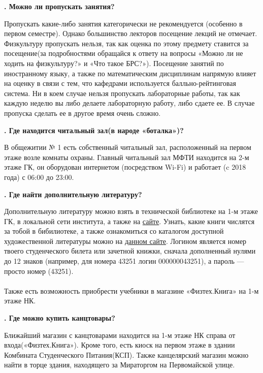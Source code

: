 \documentclass[14pt]{extarticle}
\newcounter{question}
\newcommand\Que[1]{%
    \begin{minipage}{\textwidth}
    \leavevmode\par
    \stepcounter{question}
    \noindent
    {\large\textbf{\thequestion. #1}}\par}
\newcommand\Ans[2][]{%
    \leavevmode\par\noindent
    {\leftskip37pt
    \textbf{#1}#2\par}
    \end{minipage}}
\begin{document}
\Que{Можно ли пропускать занятия?}
\Ans{Пропускать какие-либо занятия категорически не рекомендуется (особенно в первом семестре). Однако большинство лекторов посещение лекций не отмечает. Физкультуру пропускать нельзя, так как оценка по этому предмету ставится за посещение(за подробностями обращайся к ответу на вопросы «Можно ли не ходить на физкультуру?» и «Что такое БРС?»). Посещение занятий по иностранному языку, а также по математическим дисциплинам напрямую влияет на оценку в связи с тем, что кафедрами используется балльно-рейтинговая система. Ни в коем случае нельзя пропускать лабораторные работы, так как каждую неделю вы либо делаете лабораторную работу, либо сдаете ее. В случае пропуска сделать ее в другое время очень сложно.}

\Que{Где находится читальный зал(в народе «боталка»)?}
\Ans{В общежитии № 1 есть собственный читальный зал, расположенный на первом этаже возле комнаты охраны. Главный читальный зал МФТИ находится на 2-м этаже ГК, он оборудован интернетом (посредством Wi-Fi) и работает (c 2018 года) с 06:00 до 23:00.}

\Que{Где найти дополнительную литературу?}
\Ans{Дополнительную литературу можно взять в технической библиотеке на 1-м этаже ГК, в локальной сети института, а также на \href{http://lib.mipt.ru}{сайте}. Узнать, какие книги числятся за тобой в бибилиотеке, а также ознакомиться со каталогом доступной художественной литературы можно на \href{http://ruslanlib.phystech.edu/}{данном сайте}. Логином является номер твоего студенческого билета или зачетной книжки, сначала дополненный нулями до 12 знаков (например, для номера 43251 логин 000000043251), а пароль — просто номер (43251). \\ \\ Также есть возможность приобрести учебники в магазине «Физтех.Книга» на 1-м этаже НК.}

\Que{Где можно купить канцтовары?}
\Ans{Ближайший магазин с канцтоварами находится на 1-м этаже НК справа от входа(«Физтех.Книга»). Кроме того, есть киоск на первом этаже в здании Комбината Студенческого Питания(КСП). Также канцелярский магазин можно найти в торце здания, находящего за Мираторгом на Первомайской улице. }
\end{document}
